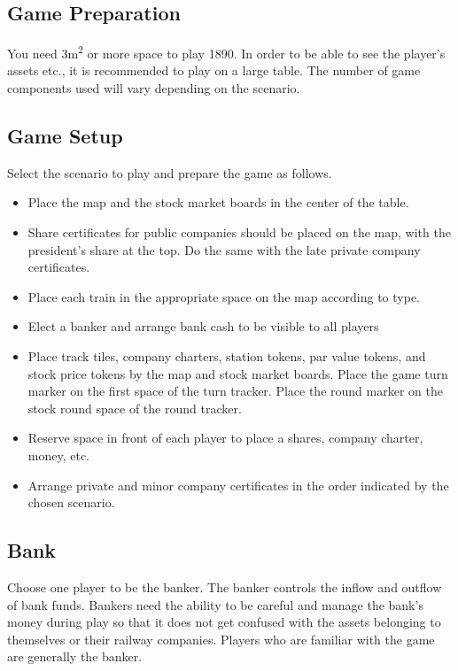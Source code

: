 \documentclass{article}
\begin{document}
\begin{CJK}{UTF8}{min}
\begin{multicols}{2}
\section{Game Preparation}
You need 3m\textsuperscript{2} or more space to play 1890. In order to
be able to see the player's assets etc., it is recommended to play on
a large table. The number of game components used will vary depending
on the scenario.


\subsection{Game Setup}
Select the scenario to play and prepare the game as follows.
\begin{itemize}
\item Place the map and the stock market boards in the center of the table.

\item Share certificates for public companies should be placed on the
  map, with the president's share at the top. Do the same with the
  late private company certificates.

\item Place each train in the appropriate space on the map according to type.

\item Elect a banker and arrange bank cash to be visible to all players

\item Place track tiles, company charters, station tokens, par
  value tokens, and stock price tokens by the map and stock market
  boards. Place the game turn marker on the first space of the turn
  tracker. Place the round marker on the stock round space of the
  round tracker.

\item Reserve space in front of each player to place a shares, company
  charter, money, etc.

\item Arrange private and minor company certificates in the order
  indicated by the chosen scenario.

\end{itemize}


\subsection{Bank}
Choose one player to be the banker. The banker controls the inflow and
outflow of bank funds. Bankers need the ability to be careful and
manage the bank's money during play so that it does not get confused
with the assets belonging to themselves or their railway companies.
Players who are familiar with the game are generally the banker.


\end{multicols}
\end{CJK}
\end{document}

